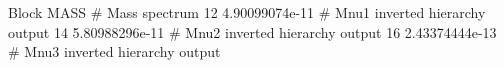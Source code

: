 Block MASS                      # Mass spectrum
        12     4.90099074e-11   # Mnu1 inverted hierarchy output
        14     5.80988296e-11   # Mnu2 inverted hierarchy output
        16     2.43374444e-13   # Mnu3 inverted hierarchy output
